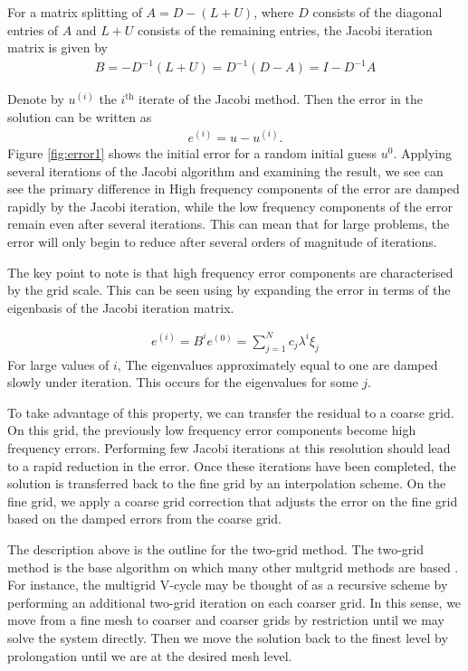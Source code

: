 For a matrix splitting of $A=D-(L+U)$, where $D$ consists of the diagonal entries of $A$ and $L+U$ consists of the remaining entries, the Jacobi iteration matrix is given by
\begin{align}
	B = -D^{-1} \left( L+U \right) = D^{-1} \left( D - A \right) = I - D^{-1} A
\end{align}

Denote by $u^{(i)}$ the $i^{\mathrm{th}}$ iterate of the Jacobi method.
Then the error in the solution can be written as
\begin{align}
	e^{(i)} = u - u^{(i)}.
\end{align}
Figure \ref{fig:error1} shows the initial error for a random initial guess $u^{0}$.
Applying several iterations of the Jacobi algorithm and examining the result, we see can see the primary difference in 
High frequency components of the error are damped rapidly by the Jacobi iteration, while the low frequency components of the error remain even after several iterations.
This can mean that for large problems, the error will only begin to reduce after several orders of magnitude of iterations.

The key point to note is that high frequency error components are characterised by the grid scale.
This can be seen using by expanding the error in terms of the eigenbasis of the Jacobi iteration matrix.

\begin{align}
	e^{(i)} = B^i e^{(0)} = \sum_{j=1}^{N} c_j \lambda^i \xi_j
\end{align}
For large values of $i$,
The eigenvalues approximately equal to one are damped slowly under iteration.
This occurs for the eigenvalues for some $j$.


To take advantage of this property, we can transfer the residual to a coarse grid.
On this grid, the previously low frequency error components become high frequency errors.
Performing few Jacobi iterations at this resolution should lead to a rapid reduction in the error.
Once these iterations have been completed, the solution is transferred back to the fine grid by an interpolation scheme.
On the fine grid, we apply a coarse grid correction that adjusts the error on the fine grid based on the damped errors from the coarse grid.

The description above is the outline for the two-grid method.
The two-grid method is the base algorithm on which many other multgrid methods are based \cite{hackbusch}.
For instance, the multigrid V-cycle may be thought of as a recursive scheme by performing an additional two-grid iteration on each coarser grid.
In this sense, we move from a fine mesh to coarser and coarser grids by restriction until we may solve the system directly.
Then we move the solution back to the finest level by prolongation until we are at the desired mesh level. 


